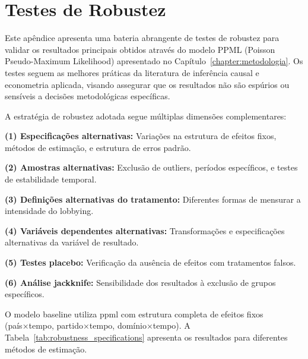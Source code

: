 \chapter{Testes de Robustez}
\label{appendix:robustness}

Este apêndice apresenta uma bateria abrangente de testes de robustez para validar os resultados principais obtidos através do modelo PPML (Poisson Pseudo-Maximum Likelihood) apresentado no Capítulo~\ref{chapter:metodologia}. Os testes seguem as melhores práticas da literatura de inferência causal e econometria aplicada, visando assegurar que os resultados não são espúrios ou sensíveis a decisões metodológicas específicas.


A estratégia de robustez adotada segue múltiplas dimensões complementares:

\textbf{(1) Especificações alternativas:} Variações na estrutura de efeitos fixos, métodos de estimação, e estrutura de erros padrão.

\textbf{(2) Amostras alternativas:} Exclusão de outliers, períodos específicos, e testes de estabilidade temporal.

\textbf{(3) Definições alternativas do tratamento:} Diferentes formas de mensurar a intensidade do lobbying.

\textbf{(4) Variáveis dependentes alternativas:} Transformações e especificações alternativas da variável de resultado.

\textbf{(5) Testes placebo:} Verificação da ausência de efeitos com tratamentos falsos.

\textbf{(6) Análise jackknife:} Sensibilidade dos resultados à exclusão de grupos específicos.



O modelo baseline utiliza \acrshort{ppml} com estrutura completa de efeitos fixos (país×tempo, partido×tempo, domínio×tempo). A Tabela~\ref{tab:robustness_specifications} apresenta os resultados para diferentes métodos de estimação.


